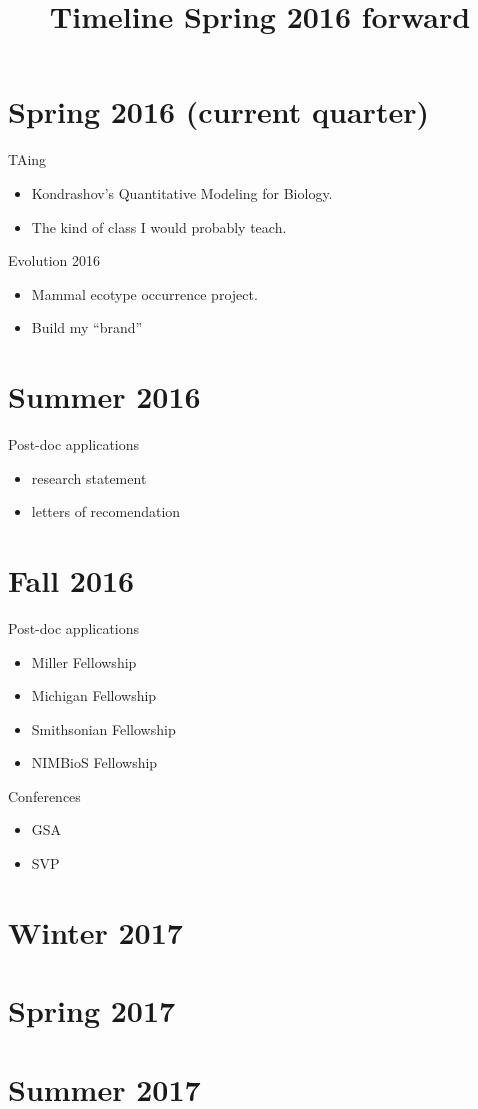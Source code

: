 \documentclass{article}
\title{Timeline Spring 2016 forward}
\date{}
\begin{document}
\linenumbers
\modulolinenumbers[2]

\maketitle

\section{Spring 2016 (current quarter)}
TAing 
\begin{itemize}
  \item Kondrashov's Quantitative Modeling for Biology.
  \item The kind of class I would probably teach.
\end{itemize}

Evolution 2016
\begin{itemize}
  \item Mammal ecotype occurrence project.
  \item Build my ``brand''
\end{itemize}


\section{Summer 2016}
Post-doc applications
\begin{itemize}
  \item research statement
  \item letters of recomendation 
\end{itemize}


\section{Fall 2016}
Post-doc applications
\begin{itemize}
  \item Miller Fellowship
  \item Michigan Fellowship
  \item Smithsonian Fellowship
  \item NIMBioS Fellowship
\end{itemize}

Conferences
\begin{itemize}
  \item GSA
  \item SVP
\end{itemize}


\section{Winter 2017}


\section{Spring 2017}


\section{Summer 2017}
\end{document}
